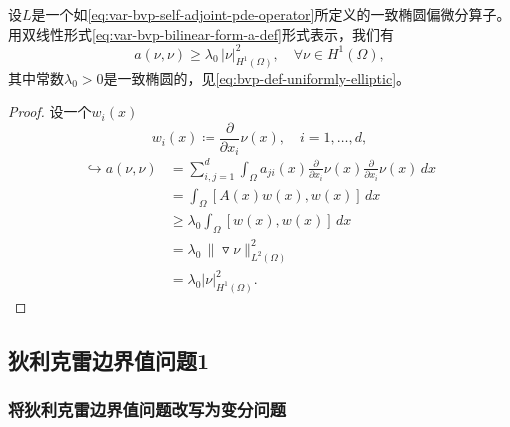 \begin{lemma}[双线性算子的半椭圆特性]
  \label{lemma:var-bvp-operator-ellipticity-property}
  设$L$是一个如\eqref{eq:var-bvp-self-adjoint-pde-operator}所定义的一致椭圆偏微分算子。用双线性形式\eqref{eq:var-bvp-bilinear-form-a-def}形式表示，我们有
  \begin{equation}
    \label{eq:var-bvp-bilinear-a-nunu}
    a(\nu,\nu) \ge \lambda_0 \, \big| \nu \big|_{H^{1}(\Omega)}^2, \quad \forall \nu \in H^{1}(\Omega),
  \end{equation}
  其中常数$\lambda_0 > 0$是一致椭圆的，见\eqref{eq:bvp-def-uniformly-elliptic}。
\end{lemma}

\begin{proof}
  设一个$w_i(x)$
  \begin{equation*}
    w_i(x) \coloneqq \frac{\partial}{\partial x_i} \nu(x), \quad i=1,\ldots,d,
  \end{equation*}
  \begin{equation*}
    \begin{split}
      \hookrightarrow a(\nu, \nu) & = \sum_{i,j=1}^{d} \int_{\Omega}
      a_{ji}(x) \frac{\partial}{\partial x_i} \nu(x) \frac{\partial}{\partial x_i} \nu(x)  \, dx \\
      &= \int_{\Omega} \left[ A(x) w(x), w(x) \right] \, dx \\
      & \ge \lambda_0 \int_{\Omega} \left[ w(x), w(x) \right] \, dx \\
      & = \lambda_0 \, \big\| \triangledown \nu \big\|_{L^{2}(\Omega)}^2\\
      & = \lambda_0 \big| \nu \big|_{H^1(\Omega)}^2.
    \end{split}
  \end{equation*}
\end{proof}

\subsection{狄利克雷边界值问题1}
\label{sec:var-bvp-dirichlet}

\subsubsection{将狄利克雷边界值问题改写为变分问题}

